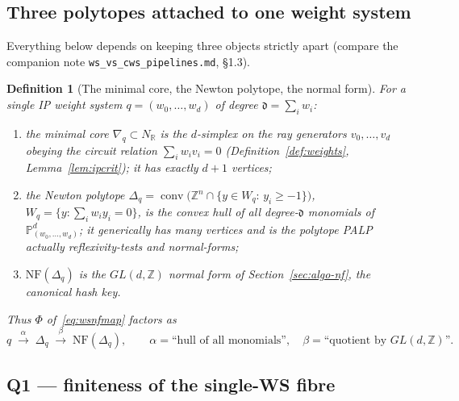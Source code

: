 \documentclass{amsart}
\newtheorem{definition}[theorem]{Definition}
\begin{document}
\subsection{Three polytopes attached to one weight system}
\label{sec:fibre-three}

Everything below depends on keeping three objects strictly apart (compare the
companion note \texttt{ws\_vs\_cws\_pipelines.md}, \S1.3).

\begin{definition}[The minimal core, the Newton polytope, the normal form]
\label{def:threepoly}
For a single IP weight system $q=(w_0,\dots,w_d)$ of degree
$\mathfrak d=\sum_i w_i$:
\begin{enumerate}
  \item the \emph{minimal core} $\nabla_q\subset N_{\mathbb R}$ is the
        $d$-simplex on the ray generators $v_0,\dots,v_d$ obeying the circuit
        relation $\sum_i w_i v_i=0$ (Definition~\ref{def:weights},
        Lemma~\ref{lem:ipcrit}); it has exactly $d{+}1$ vertices;
  \item the \emph{Newton polytope}
        $\Delta_q=\operatorname{conv}\bigl(\mathbb Z^{n}\cap\{y\in W_q:\,
        y_i\ge -1\}\bigr)$, $W_q=\{y:\sum_i w_i y_i=0\}$, is the convex hull of
        \emph{all} degree-$\mathfrak d$ monomials of
        $\mathbb P^{d}_{(w_0,\dots,w_d)}$; it generically has \emph{many}
        vertices and is the polytope PALP actually reflexivity-tests and
        normal-forms;
  \item $\mathrm{NF}(\Delta_q)$ is the $GL(d,\mathbb Z)$ normal form of
        Section~\ref{sec:algo-nf}, the canonical hash key.
\end{enumerate}
Thus $\Phi$ of~\eqref{eq:wsnfmap} factors as
\begin{equation}\label{eq:phifactor}
  q \;\xrightarrow{\ \alpha\ }\; \Delta_q \;\xrightarrow{\ \beta\ }\;
  \mathrm{NF}(\Delta_q),
  \qquad
  \alpha=\text{``hull of all monomials''},\quad
  \beta=\text{``quotient by }GL(d,\mathbb Z)\text{''}.
\end{equation}
\end{definition}

\subsection{Q1 --- finiteness of the single-WS fibre}
\label{sec:fibre-finite}
\end{document}
